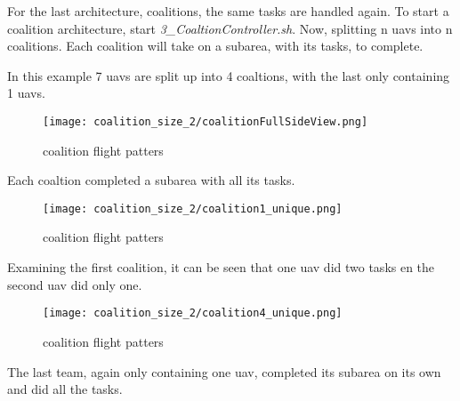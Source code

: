 For the last architecture, coalitions, the same tasks are handled again. To start a coalition architecture, start 
\textit{3\_CoaltionController.sh}.
Now, splitting n \acp{uav} into n coalitions. Each coalition will take on a subarea, with its tasks, to complete.

In this example 7 \acp{uav} are split up into 4 coaltions, with the last only containing 1 \acp{uav}.

\begin{figure}[ht]
    \centering
    \texttt{[image: coalition\_size\_2/coalitionFullSideView.png]}
    \caption[coalition flight patters]{coalition flight patters}
\end{figure}

Each coaltion completed a subarea with all its tasks. 

\newpage
\begin{figure}[ht]
    \centering
    \texttt{[image: coalition\_size\_2/coalition1\_unique.png]}
    \caption[coalition flight patters]{coalition flight patters}
\end{figure}

Examining the first coalition, it can be seen that one \acs{uav} did two tasks en the second \acs{uav} did only one.

\begin{figure}[ht]
    \centering
    \texttt{[image: coalition\_size\_2/coalition4\_unique.png]}
    \caption[coalition flight patters]{coalition flight patters}
\end{figure}

The last team, again only containing one \acs{uav}, completed its subarea on its own and did all the tasks.
